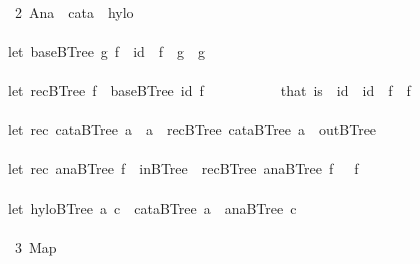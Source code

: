 \documentclass[a4paper]{article}
\begin{document}
\begin{tabbing}
\ttfamily ~\\
\ttfamily ~~2~Ana~~cata~~hylo~\\
\ttfamily ~\\
\ttfamily ~let~baseBTree~g~f~~id~~f~~g~~g\\
\ttfamily ~\\
\ttfamily ~let~recBTree~f~~baseBTree~id~f~~~~~~~~~~~that~is~~id~~id~~f~~f\\
\ttfamily ~\\
\ttfamily ~let~rec~cataBTree~a~~a~~recBTree~cataBTree~a~~outBTree\\
\ttfamily ~\\
\ttfamily ~let~rec~anaBTree~f~~inBTree~~recBTree~anaBTree~f~~~f\\
\ttfamily ~\\
\ttfamily ~let~hyloBTree~a~c~~cataBTree~a~~anaBTree~c\\
\ttfamily ~\\
\ttfamily ~~3~Map~\\

\end{tabbing}
\end{document}
